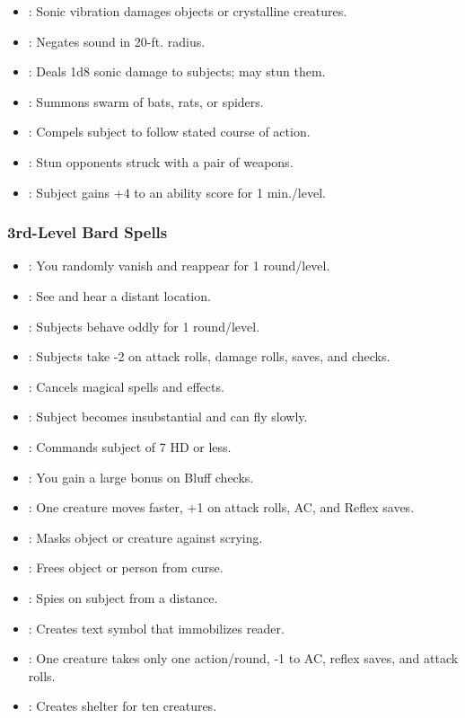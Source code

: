 \begin{itemize}
\item {}: Sonic vibration damages objects or crystalline creatures.
\item {}: Negates sound in 20-ft. radius.
\item {}: Deals 1d8 sonic damage to subjects; may stun them.
\item {}: Summons swarm of bats, rats, or spiders.
\item {}: Compels subject to follow stated course of action.
\item {}: Stun opponents struck with a pair of weapons.
\item {}: Subject gains +4 to an ability score for 1 min./level.
\end{itemize}
\subsubsection{3rd-Level Bard Spells}
\begin{itemize}
\item {}: You randomly vanish and reappear for 1 round/level.
\item {}: See and hear a distant location.
\item {}: Subjects behave oddly for 1 round/level.
\item {}: Subjects take -2 on attack rolls, damage rolls, saves, and checks.
\item {}: Cancels magical spells and effects.
\item {}: Subject becomes insubstantial and can fly slowly.
\item {}: Commands subject of 7 HD or less.
\item {}: You gain a large bonus on Bluff checks.
\item {}: One creature moves faster, +1 on attack rolls, AC, and Reflex saves.
\item {}: Masks object or creature against scrying.
\item {}: Frees object or person from curse.
\item {}: Spies on subject from a distance.
\item {}: Creates text symbol that immobilizes reader.
\item {}: One creature takes only one action/round, -1 to AC, reflex saves, and attack rolls.
\item {}: Creates shelter for ten creatures.
\end{itemize}

